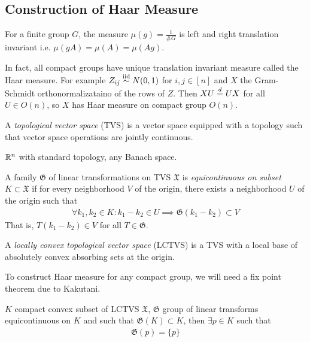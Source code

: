 \subsection{Construction of Haar Measure}

For a finite group $G$, the measure $\mu(g) = \frac{1}{\# G}$ is
left and right translation invariant i.e. $\mu(gA) = \mu(A) = \mu(Ag)$.

In fact, all compact groups have unique translation invariant measure
called the Haar measure. For example $Z_{ij} \overset{\text{iid}}{\sim} N(0,1)$ for $i,j \in [n]$
and $X$ the Gram-Schmidt orthonormalizataino of the rows of $Z$.
Then $X U \overset{d}{=} U X$ for all $U \in O(n)$, so $X$ has Haar measure
on compact group $O(n)$.

\begin{definition}
  A \emph{topological vector space} (TVS) is a vector space equipped with
  a topology such that vector space operations are jointly
  continuous.
\end{definition}

\begin{example}
  $\mathbb{R}^n$ with standard topology, any Banach space.
\end{example}

\begin{definition}
  A family $\mathfrak{G}$ of linear transformations on TVS
  $\mathfrak{X}$ is \emph{equicontinuous on subset $K \subset \mathfrak{X}$}
  if for every neighborhood $V$ of the origin, there exists a neighborhood
  $U$ of the origin such that
  \begin{align}
    \forall k_1, k_2 \in K: k_1 - k_2 \in U \implies \mathfrak{G}(k_1 - k_2) \subset V
  \end{align}
  That is, $T(k_1 - k_2) \in V$ for all $T \in \mathfrak{G}$.
\end{definition}

\begin{definition}
  A \emph{locally convex topological vector space} (LCTVS) is a TVS
  with a local base of absolutely convex absorbing sets at the origin.
\end{definition}

To construct Haar measure for any compact group, we will need a fix point
theorem due to Kakutani.

\begin{theorem}
  \label{thm:kakutani}
  $K$ compact convex subset of LCTVS $\mathfrak{X}$,
  $\mathfrak{G}$ group of linear transforms equicontinuous on $K$
  and such that $\mathfrak{G}(K) \subset K$,
  then $\exists p \in K$ such that
  \begin{align}
    \mathfrak{G}(p) = \{p\}
  \end{align}
\end{theorem}

